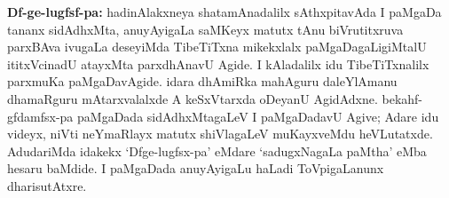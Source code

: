 {\bf Df-ge-lugfsf-pa:} hadinAlakxneya shatamAnadalilx sAthxpitavAda I paMgaDa tananx sidAdhxMta, anuyAyigaLa saMKeyx matutx tAnu biVrutitxruva parxBAva ivugaLa deseyiMda TibeTiTxna mikekxlalx paMgaDagaLigiMtalU ititxVcinadU atayxMta parxdhAnavU Agide. I kAladalilx idu TibeTiTxnalilx parxmuKa paMgaDavAgide. idara dhAmiRka mahAguru daleYlAmanu dhamaRguru mAtarxvalalxde A keSxVtarxda oDeyanU AgidAdxne. bekahf-gfdamfsx-pa paMgaDada sidAdhxMtagaLeV I paMgaDadavU Agive; Adare idu videyx, niVti neYmaRlayx matutx shiVlagaLeV muKayxveMdu heVLutatxde. AdudariMda idakekx `Dfge-lugfsx-pa' eMdare `sadugxNagaLa paMtha' eMba hesaru baMdide. I paMgaDada anuyAyigaLu haLadi ToVpigaLanunx dharisutAtxre.

\newpage
{}
\theendnotes
{}

